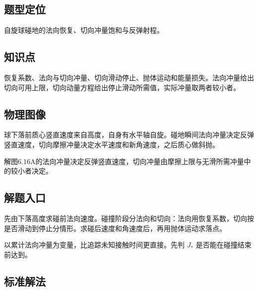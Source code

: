 \documentclass[UTF8,fontset=fandol,a4paper,11pt]{ctexart}
\begin{document}


\subsection*{题型定位}

自旋球碰地的法向恢复、切向冲量饱和与反弹射程。



\subsection*{知识点}

恢复系数、法向与切向冲量、切向滑动停止、抛体运动和能量损失。法向冲量给出切向可用上限，切向动量方程给出停止滑动所需值，实际冲量取两者较小者。




\subsection*{物理图像}

球下落前质心竖直速度来自高度，自身有水平轴自旋。碰地瞬间法向冲量决定反弹竖直速度，切向摩擦冲量决定水平速度和新角速度，之后质心做斜抛。

解图6.16A的法向冲量决定反弹竖直速度，切向冲量由摩擦上限与无滑所需冲量中的较小者决定。



\subsection*{解题入口}

先由下落高度求碰前法向速度。碰撞阶段分法向和切向：法向用恢复系数，切向按是否滑动到停止分情形。求碰后速度和角速度后，再用抛体运动求落点。

以累计法向冲量为变量，比追踪未知接触时间更直接。先判 $J_*$ 是否能在碰撞结束前达到。



\subsection*{标准解法}
\end{document}
